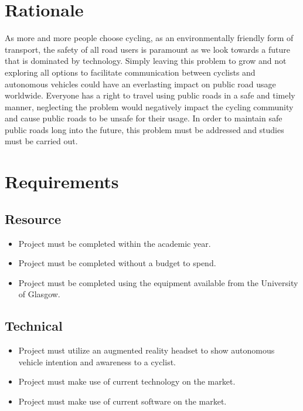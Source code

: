 \documentclass{l4proj}
\begin{document}
\section{Rationale}

As more and more people choose cycling, as an environmentally friendly form of transport, the safety of all road users is paramount as we look towards a future that is dominated by technology. Simply leaving this problem to grow and not exploring all options to facilitate communication between cyclists and autonomous vehicles could have an everlasting impact on public road usage worldwide. Everyone has a right to travel using public roads in a safe and timely manner, neglecting the problem would negatively impact the cycling community and cause public roads to be unsafe for their usage. In order to maintain safe public roads long into the future, this problem must be addressed and studies must be carried out.

\section{Requirements}

\subsection{Resource}

\begin{itemize}
    \item Project must be completed within the academic year.
    \item Project must be completed without a budget to spend.
    \item Project must be completed using the equipment available from the University of Glasgow.
\end{itemize}

\subsection{Technical}

\begin{itemize}
    \item Project must utilize an augmented reality headset to show autonomous vehicle intention and awareness to a cyclist.
    \item Project must make use of current technology on the market.
    \item Project must make use of current software on the market.
\end{itemize}
\end{document}
